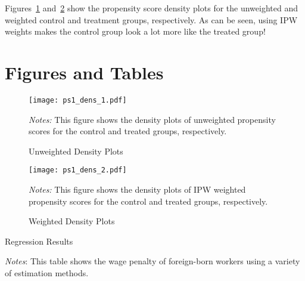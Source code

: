 \documentclass{article} %
\newcommand*\InputTable[1]{}
\begin{document}
Figures~\ref{fig:ps1_dens_1} and~\ref{fig:ps1_dens_2} show the propensity score density plots for the unweighted and weighted control and treatment groups, respectively.
As can be seen, using IPW weights makes the control group look a lot more like the treated group!





\clearpage
\newpage

\section{Figures and Tables}
\label{sec:figs_tabs}

\begin{figure}[htb]
    \caption{Unweighted Density Plots}
    \label{fig:ps1_dens_1}
    \centering
    \texttt{[image: ps1\_dens\_1.pdf]}
    \medskip
    \begin{minipage}{0.80 \textwidth}
    {\footnotesize \emph{Notes:} This figure shows the density plots of unweighted propensity scores for the control and
    treated groups, respectively.
    }
    \end{minipage}
\end{figure}

\begin{figure}[htb]
    \caption{Weighted Density Plots}
    \label{fig:ps1_dens_2}
    \centering
    \texttt{[image: ps1\_dens\_2.pdf]}
    \medskip
    \begin{minipage}{0.80 \textwidth}
    {\footnotesize \emph{Notes:} This figure shows the density plots of IPW weighted propensity scores for the control and
    treated groups, respectively.
    }
    \end{minipage}
\end{figure}

\begin{table}[htb]
    \caption{Regression Results} 
    \label{tab:ps1_tabp5_2}
    \centering
    \InputTable{ps1_tabp5_2}
    \medskip
    \begin{minipage}{0.95 \textwidth}
    {\footnotesize
    \emph{Notes}: This table shows the wage penalty of foreign-born workers using a variety of estimation methods.}
    \end{minipage}
\end{table}


\end{document}
